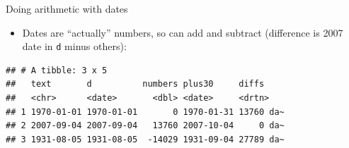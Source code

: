 \documentclass[
  ignorenonframetext,
]{beamer}
\newenvironment{Shaded}{\begin{snugshade}}{\end{snugshade}}
\newcommand{\DataTypeTok}[1]{\textcolor[rgb]{0.13,0.29,0.53}{#1}}
\newcommand{\DecValTok}[1]{\textcolor[rgb]{0.00,0.00,0.81}{#1}}
\newcommand{\KeywordTok}[1]{\textcolor[rgb]{0.13,0.29,0.53}{\textbf{#1}}}
\newcommand{\NormalTok}[1]{#1}
\newcommand{\OperatorTok}[1]{\textcolor[rgb]{0.81,0.36,0.00}{\textbf{#1}}}
\newcommand{\StringTok}[1]{\textcolor[rgb]{0.31,0.60,0.02}{#1}}
\providecommand{\tightlist}{%
  \setlength{\itemsep}{0pt}\setlength{\parskip}{0pt}}
\begin{document}
\begin{frame}[fragile]{Doing arithmetic with dates}
\protect\hypertarget{doing-arithmetic-with-dates}{}

\begin{itemize}
\tightlist
\item
  Dates are ``actually'' numbers, so can add and subtract (difference is
  2007 date in \texttt{d} minus others):
\end{itemize}

\begin{Shaded}
\end{Shaded}

\begin{verbatim}
## # A tibble: 3 x 5
##   text       d          numbers plus30     diffs    
##   <chr>      <date>       <dbl> <date>     <drtn>   
## 1 1970-01-01 1970-01-01       0 1970-01-31 13760 da~
## 2 2007-09-04 2007-09-04   13760 2007-10-04     0 da~
## 3 1931-08-05 1931-08-05  -14029 1931-09-04 27789 da~
\end{verbatim}

\end{frame}
\end{document}
